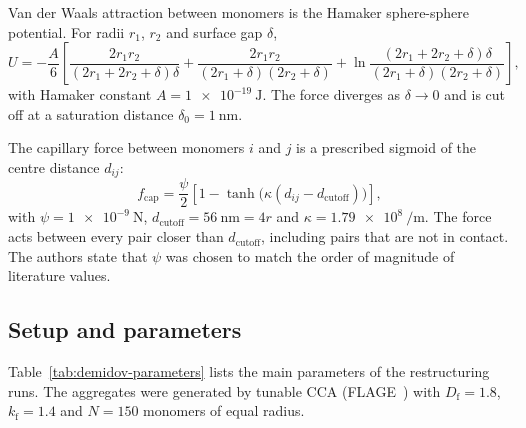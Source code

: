 \documentclass[11pt,a4paper]{article}
\newcommand{\Df}{D_\text{f}}
\begin{document}
Van der Waals attraction between monomers is the Hamaker sphere-sphere potential.
For radii $r_1$, $r_2$ and surface gap $\delta$,
\begin{equation}
  U = -\frac{A}{6}\left[\frac{2r_1r_2}{(2r_1+2r_2+\delta)\delta}
      + \frac{2r_1r_2}{(2r_1+\delta)(2r_2+\delta)}
      + \ln\frac{(2r_1+2r_2+\delta)\delta}{(2r_1+\delta)(2r_2+\delta)}\right] ,
  \label{eq:hamaker}
\end{equation}
with Hamaker constant $A = \SI{1e-19}{\joule}$.
The force diverges as $\delta \to 0$ and is cut off at a saturation distance $\delta_0 = \SI{1}{\nano\meter}$.

The capillary force between monomers $i$ and $j$ is a prescribed sigmoid of the centre distance $d_{ij}$:
\begin{equation}
  f_\text{cap} = \frac{\psi}{2}\left[1 - \tanh\bigl(\kappa (d_{ij} - d_\text{cutoff})\bigr)\right] ,
  \label{eq:sigmoid}
\end{equation}
with $\psi = \SI{1e-9}{\newton}$, $d_\text{cutoff} = \SI{56}{\nano\meter} = 4r$ and $\kappa = \SI{1.79e8}{\per\meter}$.
The force acts between every pair closer than $d_\text{cutoff}$, including pairs that are not in contact.
The authors state that $\psi$ was chosen to match the order of magnitude of literature values.

\subsection{Setup and parameters}
\label{sec:parameters}

Table~\ref{tab:demidov-parameters} lists the main parameters of the restructuring runs.
The aggregates were generated by tunable CCA (FLAGE~\cite{skorupski2014}) with $\Df = 1.8$, $k_\text{f} = 1.4$ and $N = 150$ monomers of equal radius.
\end{document}
